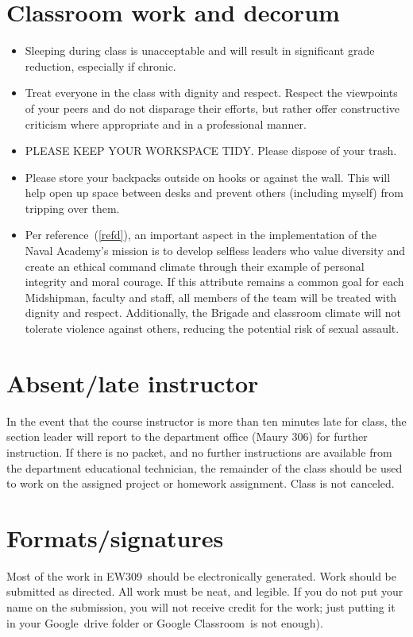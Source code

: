 \documentclass[11pt,courier]{navymemo}
\newcommand{\usnaCourseNumber}{EW309}
\newcommand{\Google}{Google}
\newcommand{\GoogleClassroom}{Google Classroom}
\begin{document}
\section{Classroom work and decorum}
\begin{itemize}
\item Sleeping during class is unacceptable and will result in significant grade reduction, especially if chronic.
\item Treat everyone in the class with dignity and respect. Respect the viewpoints of your peers and do not disparage their efforts, but rather offer constructive criticism where appropriate and in a professional manner.
\item PLEASE KEEP YOUR WORKSPACE TIDY. Please dispose of your trash.
\item Please store your backpacks outside on hooks or against the wall. This will help open up space between desks and prevent others (including myself) from tripping over them.
\item Per reference~(\ref{refd}), an important aspect in the implementation of the Naval Academy’s mission is to develop selfless leaders who value diversity and create an ethical command climate through their example of personal integrity and moral courage. If this attribute remains a common goal for each Midshipman, faculty and staff, all members of the team will be treated with dignity and respect. Additionally, the Brigade and classroom climate will not tolerate violence against others, reducing the potential risk of sexual assault.
\end{itemize}

\section{Absent/late instructor}
In the event that the course instructor is more than ten minutes late for class, the section leader will report to the department office (Maury 306) for further instruction. If there is no packet, and no further instructions are available from the department educational technician, the remainder of the class should be used to work on the assigned project or homework assignment.  Class is not canceled.
 
\section{Formats/signatures}
Most of the work in \usnaCourseNumber\ should be electronically generated. Work should be submitted as directed. All work must be neat,  and legible. If you do not put your name on the submission, you will not receive credit for the work; just putting it in your \Google\ drive folder or \GoogleClassroom\ is not enough).
 
\end{document}
